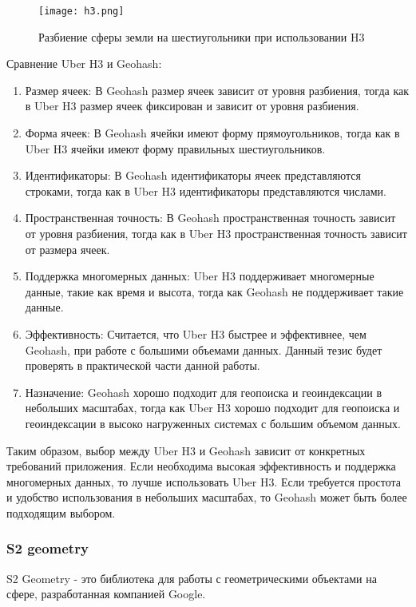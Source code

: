 \begin{figure}[h]
    \centering
    \texttt{[image: h3.png]}
    \caption{Разбиение сферы земли на шестиугольники при использовании H3}
\end{figure}

Сравнение Uber H3 и Geohash:
\begin{enumerate}
    \item Размер ячеек: В Geohash размер ячеек зависит от уровня разбиения, тогда как в Uber H3 размер ячеек фиксирован и зависит от уровня разбиения.
    \item Форма ячеек: В Geohash ячейки имеют форму прямоугольников, тогда как в Uber H3 ячейки имеют форму правильных шестиугольников.
    \item Идентификаторы: В Geohash идентификаторы ячеек представляются строками, тогда как в Uber H3 идентификаторы представляются числами.
    \item Пространственная точность: В Geohash пространственная точность зависит от уровня разбиения, тогда как в Uber H3 пространственная точность зависит от размера ячеек.
    \item Поддержка многомерных данных: Uber H3 поддерживает многомерные данные, такие как время и высота, тогда как Geohash не поддерживает такие данные.
    \item Эффективность: Считается, что Uber H3 быстрее и эффективнее, чем Geohash, при работе с большими объемами данных. Данный тезис будет проверять в практической части данной работы.
    \item Назначение: Geohash хорошо подходит для геопоиска и геоиндексации в небольших масштабах, тогда как Uber H3 хорошо подходит для геопоиска и геоиндексации в высоко нагруженных системах с большим объемом данных.
\end{enumerate}

Таким образом, выбор между Uber H3 и Geohash зависит от конкретных требований приложения. Если необходима высокая эффективность и поддержка многомерных данных, то лучше использовать Uber H3. Если требуется простота и удобство использования в небольших масштабах, то Geohash может быть более подходящим выбором.

\subsubsection{S2 geometry}

S2 Geometry - это библиотека для работы с геометрическими объектами на сфере, разработанная компанией Google.

